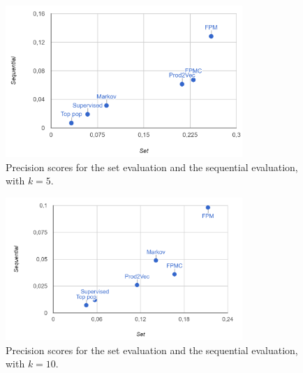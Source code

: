 \documentclass[prodmode,acmtecs]{acmsmall} %
\begin{document}
\begin{figure}[H]
	\centering			
	\includegraphics[width=0.8\textwidth]{img/precision_k_5.png}
	\caption{Precision scores for the set evaluation and the sequential evaluation, with $k=5$.}
	\label{img:precision_k_5}
\end{figure}
\begin{figure}[H]
	\centering			
	\includegraphics[width=0.8\textwidth]{img/precision_k_10.png}
	\caption{Precision scores for the set evaluation and the sequential evaluation, with $k=10$.}
	\label{img:precision_k_10}
\end{figure}
\end{document}

